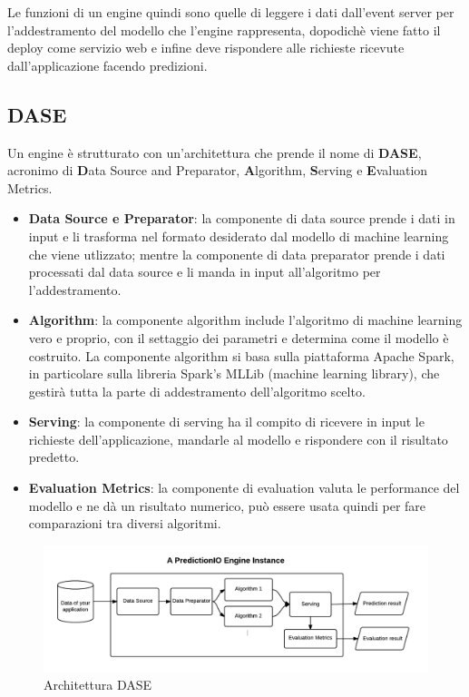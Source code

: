 Le funzioni di un engine quindi sono quelle di leggere i dati dall'event server per l'addestramento del modello che l'engine rappresenta, dopodichè viene fatto il deploy come servizio web e infine deve rispondere alle richieste ricevute dall'applicazione facendo predizioni.

\subsection{DASE}
Un engine è strutturato con un'architettura che prende il nome di \textbf{DASE}, acronimo di \textbf{D}ata Source and Preparator, \textbf{A}lgorithm, \textbf{S}erving e \textbf{E}valuation Metrics. 
\begin{itemize}
\item \textbf{Data Source e Preparator}: la componente di data source prende i dati in input e li trasforma nel formato desiderato dal modello di machine learning che viene utlizzato; mentre la componente di data preparator prende i dati processati dal data source e li manda in input all'algoritmo per l'addestramento.
\item \textbf{Algorithm}: la componente algorithm include l'algoritmo di machine learning vero e proprio, con il settaggio dei parametri e determina come il modello è costruito. La componente algorithm si basa sulla piattaforma Apache Spark, in particolare sulla libreria Spark's MLLib (machine learning library), che gestirà tutta la parte di addestramento dell'algoritmo scelto.
\item \textbf{Serving}: la componente di serving ha il compito di ricevere in input le richieste dell'applicazione, mandarle al modello e rispondere con il risultato predetto.
\item \textbf{Evaluation Metrics}: la componente di evaluation valuta le performance del modello e ne dà un risultato numerico, può essere usata quindi per fare comparazioni tra diversi algoritmi.
\end{itemize}

\begin{figure}[!h]
\includegraphics[width=1.0\textwidth]{immagini/dase.png}
\caption{Architettura DASE \cite{sitopredictionio}}
\label{fig:dase}
\end{figure}

